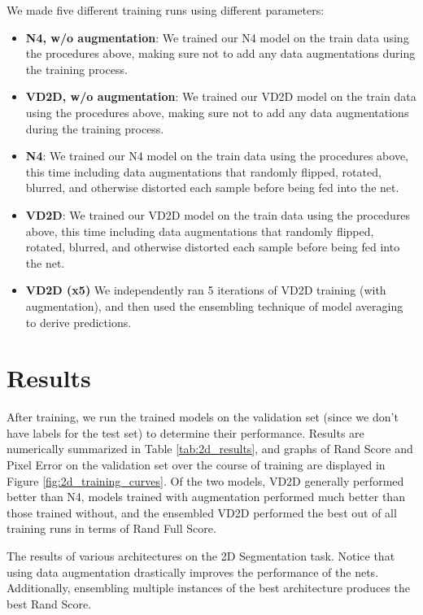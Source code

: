 We made five different training runs using different parameters:

\begin{itemize}
	\item \textbf{N4, w/o augmentation}: We trained our N4 model on the train data using the procedures above, making sure not to add any data augmentations during the training process.
	\item \textbf{VD2D, w/o augmentation}: We trained our VD2D model on the train data using the procedures above, making sure not to add any data augmentations during the training process.
	\item \textbf{N4}: We trained our N4 model on the train data using the procedures above, this time including data augmentations that randomly flipped, rotated, blurred, and otherwise distorted each sample before being fed into the net.
	\item \textbf{VD2D}: We trained our VD2D model on the train data using the procedures above, this time including data augmentations that randomly flipped, rotated, blurred, and otherwise distorted each sample before being fed into the net.
	\item \textbf{VD2D (x5)} We independently ran 5 iterations of VD2D training (with augmentation), and then used the ensembling technique of model averaging to derive predictions.
\end{itemize}

\section{Results}

After training, we run the trained models on the validation set (since we don't have labels for the test set) to determine their performance. Results are numerically summarized in Table \ref{tab:2d_results}, and graphs of Rand Score and Pixel Error on the validation set over the course of training are displayed in Figure \ref{fig:2d_training_curves}. Of the two models, VD2D generally performed better than N4, models trained with augmentation performed much better than those trained without, and the ensembled VD2D performed the best out of all training runs in terms of Rand Full Score.

\begin{table}
\centering
	
	\caption[Results of 2D Segmentation]{The results of various architectures on the 2D Segmentation task. Notice that using data augmentation drastically improves the performance of the nets. Additionally, ensembling multiple instances of the best architecture produces the best Rand Score.}
	\label{tab:2d_results}
\end{table}

